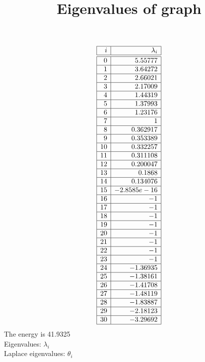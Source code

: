 \documentclass[12pt]{article}
\newcommand\setTBstruts{\def\T{\rule{0pt}{2.6ex}}%
\def\B{\rule[-1.2ex]{0pt}{0pt}}}
\begin{document}
 
\setTBstruts



{\allowdisplaybreaks%






\title{Eigenvalues of graph}
\author{}%
\maketitle%
%



$$
\begin{array}{|r|r|}
\hline
 i  & \lambda_i  \\
\hline
\hline
0 & 5.55777\\
\hline
1 & 3.64272\\
\hline
2 & 2.66021\\
\hline
3 & 2.17009\\
\hline
4 & 1.44319\\
\hline
5 & 1.37993\\
\hline
6 & 1.23176\\
\hline
7 & 1\\
\hline
8 & 0.362917\\
\hline
9 & 0.353389\\
\hline
10 & 0.332257\\
\hline
11 & 0.311108\\
\hline
12 & 0.200047\\
\hline
13 & 0.1868\\
\hline
14 & 0.134076\\
\hline
15 & -2.8585e-16\\
\hline
16 & -1\\
\hline
17 & -1\\
\hline
18 & -1\\
\hline
19 & -1\\
\hline
20 & -1\\
\hline
21 & -1\\
\hline
22 & -1\\
\hline
23 & -1\\
\hline
24 & -1.36935\\
\hline
25 & -1.38161\\
\hline
26 & -1.41708\\
\hline
27 & -1.48119\\
\hline
28 & -1.83887\\
\hline
29 & -2.18123\\
\hline
30 & -3.29692\\
\hline
\end{array}
$$
The energy is 41.9325\\
Eigenvalues: $\lambda_i$\\
Laplace eigenvalues: $\theta_i$\\


}
\end{document}
